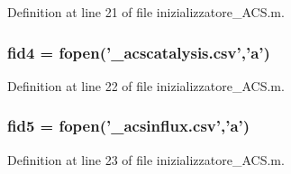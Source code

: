 Definition at line 21 of file inizializzatore\+\_\+\+A\+C\+S.\+m.

\hypertarget{a00110_a28f0b3b80ef3c84a4a00660a307d2147}{
\subsubsection[{fid4}]{\setlength{\rightskip}{0pt plus 5cm}fid4 = fopen('\+\_\+acscatalysis.\+csv','{\bf a}')}}\label{a00110_a28f0b3b80ef3c84a4a00660a307d2147}


Definition at line 22 of file inizializzatore\+\_\+\+A\+C\+S.\+m.

\hypertarget{a00110_af5f7ad66ed343bca8289a4d44dbff04f}{
\subsubsection[{fid5}]{\setlength{\rightskip}{0pt plus 5cm}fid5 = fopen('\+\_\+acsinflux.\+csv','{\bf a}')}}\label{a00110_af5f7ad66ed343bca8289a4d44dbff04f}


Definition at line 23 of file inizializzatore\+\_\+\+A\+C\+S.\+m.

